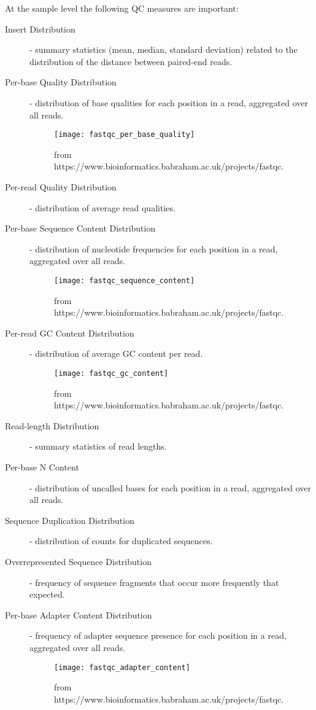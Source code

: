 At the sample level the following QC measures are important:

\begin{description}
    \item [Insert Distribution] - summary statistics (mean, median, standard deviation) related to the distribution of the distance between paired-end reads.
    \item [Per-base Quality Distribution] - distribution of base qualities for each position in a read, aggregated over all reads.
    \begin{figure}[H]
        \texttt{[image: fastqc\_per\_base\_quality]}
        \centering
        \caption {from https://www.bioinformatics.babraham.ac.uk/projects/fastqc.}
        \label{fig:fastqc_per_base_quality}
    \end{figure} 
    \item [Per-read Quality Distribution] - distribution of average read qualities.
    \item [Per-base Sequence Content Distribution] - distribution of nucleotide frequencies for each position in a read, aggregated over all reads.
    \begin{figure}[H]
        \texttt{[image: fastqc\_sequence\_content]}
        \centering
        \caption {from https://www.bioinformatics.babraham.ac.uk/projects/fastqc.}
        \label{fig:fastqc_sequence_content}
    \end{figure} 
    \item [Per-read GC Content Distribution] - distribution of average GC content per read.
    \begin{figure}[H]
        \texttt{[image: fastqc\_gc\_content]}
        \centering
        \caption {from https://www.bioinformatics.babraham.ac.uk/projects/fastqc.}
        \label{fig:fastqc_gc_content}
    \end{figure}
    
    \item [Read-length Distribution] - summary statistics of read lengths.
    \item [Per-base N Content] - distribution of uncalled bases for each position in a read, aggregated over all reads.
    \item [Sequence Duplication Distribution] - distribution of counts for duplicated sequences.
    \item [Overrepresented Sequence Distribution] - frequency of sequence fragments that occur more frequently that expected.
    \item [Per-base Adapter Content Distribution] - frequency of adapter sequence presence for each position in a read, aggregated over all reads.
    \begin{figure}[H]
        \texttt{[image: fastqc\_adapter\_content]}
        \centering
        \caption {from https://www.bioinformatics.babraham.ac.uk/projects/fastqc.}
        \label{fig:fastqc_adapter_content}
    \end{figure} 
    
\end{description}

